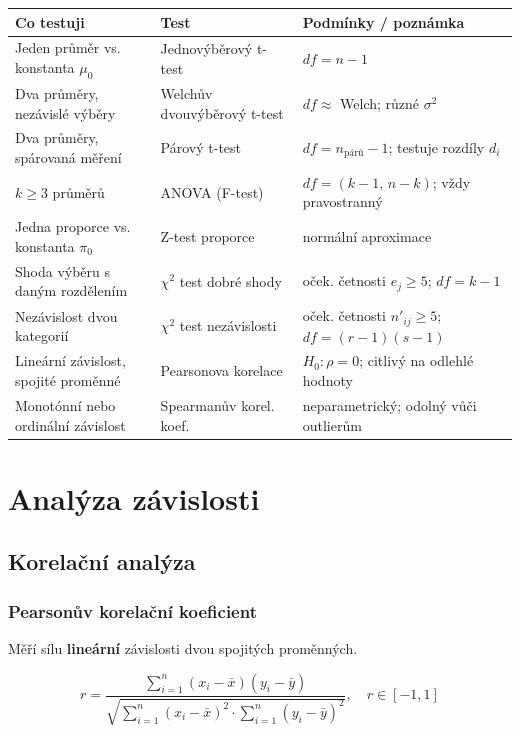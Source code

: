 \documentclass[a4paper, 11pt]{article}
\begin{document}
{\small
\renewcommand{\arraystretch}{1.3}
\begin{tabular}{p{} p{} p{}}
	\textbf{Co testuji} & \textbf{Test} & \textbf{Podmínky / poznámka} \\
	\midrule
	Jeden průměr vs. konstanta $\mu_0$ & Jednovýběrový t-test & $df = n-1$ \\
	Dva průměry, nezávislé výběry & Welchův dvouvýběrový t-test & $df \approx$ Welch; různé $\sigma^2$ \\
	Dva průměry, spárovaná měření & Párový t-test & $df = n_{\text{párů}}-1$; testuje rozdíly $d_i$ \\
	$k \ge 3$ průměrů & ANOVA (F-test) & $df = (k-1,\, n-k)$; vždy pravostranný \\
	Jedna proporce vs. konstanta $\pi_0$ & Z-test proporce & normální aproximace \\
	Shoda výběru s daným rozdělením & $\chi^2$ test dobré shody & oček. četnosti $e_j \ge 5$;\; $df = k-1$ \\
	Nezávislost dvou kategorií & $\chi^2$ test nezávislosti & oček. četnosti $n'_{ij} \ge 5$;\; $df = (r-1)(s-1)$ \\
	Lineární závislost, spojité proměnné & Pearsonova korelace & $H_0: \rho = 0$; citlivý na odlehlé hodnoty \\
	Monotónní nebo ordinální závislost & Spearmanův korel. koef. & neparametrický; odolný vůči outlierům \\
\end{tabular}}


\section{Analýza závislosti}

\subsection{Korelační analýza}

\subsubsection{Pearsonův korelační koeficient}

Měří sílu \textbf{lineární} závislosti dvou spojitých proměnných.

\begin{equation*}
	r = \frac{\sum_{i=1}^n (x_i - \bar{x})(y_i - \bar{y})}{\sqrt{\sum_{i=1}^n (x_i - \bar{x})^2 \cdot \sum_{i=1}^n (y_i - \bar{y})^2}}, \quad r \in [-1, 1]
\end{equation*}
\end{document}
